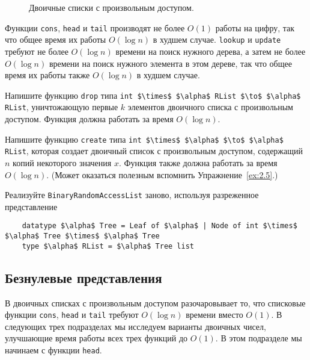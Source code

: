 \begin{figure}
  \centering
  
  \caption{Двоичные списки с произвольным доступом.}
  \label{fig:9.6}
\end{figure}

Функции \lstinline!cons!, \lstinline!head! и \lstinline!tail!
производят не более $O(1)$ работы на цифру, так что общее время их
работы $O(\log n)$ в худшем случае. \lstinline!lookup! и
\lstinline!update! требуют не более $O(\log n)$ времени на поиск
нужного дерева, а затем не более $O(\log n)$ времени на поиск нужного
элемента в этом дереве, так что общее время их работы также $O(\log
n)$ в худшем случае.

\begin{exercise}\label{ex:9.1}
  Напишите функцию \lstinline!drop! типа 
  \lstinline!int $\times$ $\alpha$ RList $\to$ $\alpha$ RList!, уничтожающую первые $k$
  элементов двоичного списка с произвольным доступом. Функция должна
  работать за время $O(\log n)$.
\end{exercise}

\begin{exercise}\label{ex:9.2}
  Напишите функцию \lstinline!create! типа 
  \lstinline!int $\times$ $\alpha$ $\to$ $\alpha$ RList!, которая создает
  двоичный список с произвольным доступом, содержащий $n$ копий
  некоторого значения $x$. Функция также должна работать за время
  $O(\log n)$. (Может оказаться полезным вспомнить Упражнение~\ref{ex:2.5}.)
\end{exercise}

\begin{exercise}\label{ex:9.3}
  Реализуйте \lstinline!BinaryRandomAccessList! заново, используя
  разреженное представление
  \begin{lstlisting}
    datatype $\alpha$ Tree = Leaf of $\alpha$ | Node of int $\times$ $\alpha$ Tree $\times$ $\alpha$ Tree
    type $\alpha$ RList = $\alpha$ Tree list
  \end{lstlisting}
\end{exercise}

\subsection{Безнулевые представления}
\label{sc:9.2.2}

В двоичных списках с произвольным доступом разочаровывает то, что
списковые функции \lstinline!cons!, \lstinline!head! и
\lstinline!tail! требуют $O(\log n)$ времени вместо $O(1)$. В
следующих трех подразделах мы исследуем варианты двоичных чисел,
улучшающие время работы всех трех функций до $O(1)$. В этом подразделе
мы начинаем с функции \lstinline!head!.


